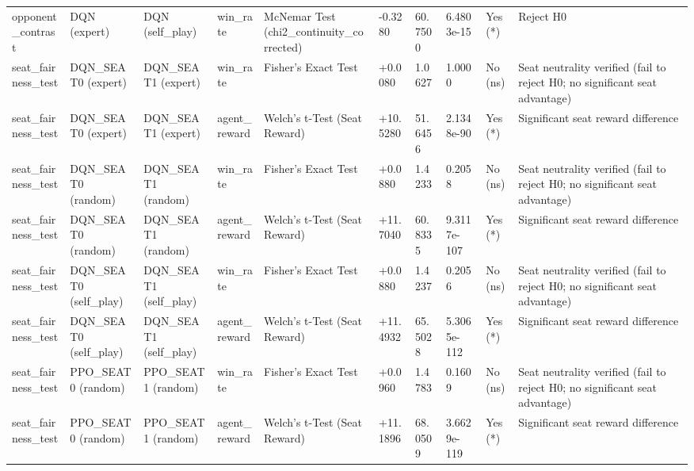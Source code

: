 \begin{table}
\begin{tabular}{llllllllll}
opponent\_contrast & DQN (expert) & DQN (self\_play) & win\_rate & McNemar Test (chi2\_continuity\_corrected) & -0.3280 & 60.7500 & 6.4803e-15 & Yes (*) & Reject H0 \\
seat\_fairness\_test & DQN\_SEAT0 (expert) & DQN\_SEAT1 (expert) & win\_rate & Fisher's Exact Test & +0.0080 & 1.0627 & 1.0000 & No (ns) & Seat neutrality verified (fail to reject H0; no significant seat advantage) \\
seat\_fairness\_test & DQN\_SEAT0 (expert) & DQN\_SEAT1 (expert) & agent\_reward & Welch's t-Test (Seat Reward) & +10.5280 & 51.6456 & 2.1348e-90 & Yes (*) & Significant seat reward difference \\
seat\_fairness\_test & DQN\_SEAT0 (random) & DQN\_SEAT1 (random) & win\_rate & Fisher's Exact Test & +0.0880 & 1.4233 & 0.2058 & No (ns) & Seat neutrality verified (fail to reject H0; no significant seat advantage) \\
seat\_fairness\_test & DQN\_SEAT0 (random) & DQN\_SEAT1 (random) & agent\_reward & Welch's t-Test (Seat Reward) & +11.7040 & 60.8335 & 9.3117e-107 & Yes (*) & Significant seat reward difference \\
seat\_fairness\_test & DQN\_SEAT0 (self\_play) & DQN\_SEAT1 (self\_play) & win\_rate & Fisher's Exact Test & +0.0880 & 1.4237 & 0.2056 & No (ns) & Seat neutrality verified (fail to reject H0; no significant seat advantage) \\
seat\_fairness\_test & DQN\_SEAT0 (self\_play) & DQN\_SEAT1 (self\_play) & agent\_reward & Welch's t-Test (Seat Reward) & +11.4932 & 65.5028 & 5.3065e-112 & Yes (*) & Significant seat reward difference \\
seat\_fairness\_test & PPO\_SEAT0 (random) & PPO\_SEAT1 (random) & win\_rate & Fisher's Exact Test & +0.0960 & 1.4783 & 0.1609 & No (ns) & Seat neutrality verified (fail to reject H0; no significant seat advantage) \\
seat\_fairness\_test & PPO\_SEAT0 (random) & PPO\_SEAT1 (random) & agent\_reward & Welch's t-Test (Seat Reward) & +11.1896 & 68.0509 & 3.6629e-119 & Yes (*) & Significant seat reward difference \\
\bottomrule
\end{tabular}
\end{table}
